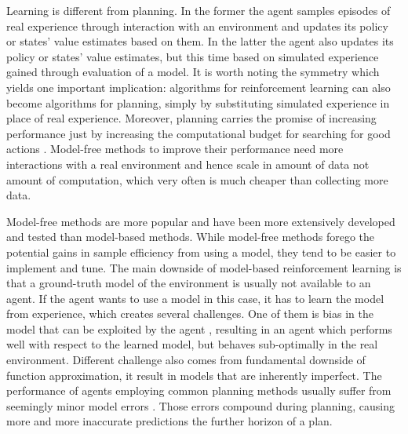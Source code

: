 Learning is different from planning. In the former the agent samples episodes of real experience through interaction with an environment and updates its policy or states' value estimates based on them. In the latter the agent also updates its policy or states' value estimates, but this time based on simulated experience gained through evaluation of a model. It is worth noting the symmetry which yields one important implication: algorithms for reinforcement learning can also become algorithms for planning, simply by substituting simulated experience in place of real experience. Moreover, planning carries the promise of increasing performance just by increasing the computational budget for searching for good actions \cite{Algo.AlphaGoZero}. Model-free methods to improve their performance need more interactions with a real environment and hence scale in amount of data not amount of computation, which very often is much cheaper than collecting more data.

Model-free methods are more popular and have been more extensively developed and tested than model-based methods. While model-free methods forego the potential gains in sample efficiency from using a model, they tend to be easier to implement and tune. The main downside of model-based reinforcement learning is that a ground-truth model of the environment is usually not available to an agent. If the agent wants to use a model in this case, it has to learn the model from experience, which creates several challenges. One of them is bias in the model that can be exploited by the agent \cite{Algo.WorldModels}, resulting in an agent which performs well with respect to the learned model, but behaves sub-optimally in the real environment. Different challenge also comes from fundamental downside of function approximation, it result in models that are inherently imperfect. The performance of agents employing common planning methods usually suffer from seemingly minor model errors  \cite{Study.PlanWithImperfectModel}. Those errors compound during planning, causing more and more inaccurate predictions the further horizon of a plan. \cite{Study.CompoundingModelError}

